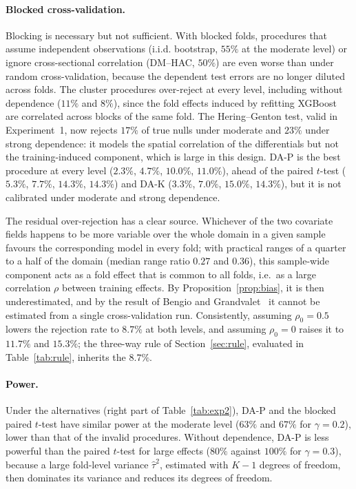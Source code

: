 \paragraph{Blocked cross-validation.} Blocking is necessary but not sufficient. With blocked folds, procedures that assume independent observations (i.i.d. bootstrap, $55\%$ at the moderate level) or ignore cross-sectional correlation (DM--HAC, $50\%$) are even worse than under random cross-validation, because the dependent test errors are no longer diluted across folds. The cluster procedures over-reject at every level, including without dependence ($11\%$ and $8\%$), since the fold effects induced by refitting XGBoost are correlated across blocks of the same fold. The Hering--Genton test, valid in Experiment~1, now rejects $17\%$ of true nulls under moderate and $23\%$ under strong dependence: it models the spatial correlation of the differentials but not the training-induced component, which is large in this design. DA-P is the best procedure at every level ($2.3\%$, $4.7\%$, $10.0\%$, $11.0\%$), ahead of the paired $t$-test ($5.3\%$, $7.7\%$, $14.3\%$, $14.3\%$) and DA-K ($3.3\%$, $7.0\%$, $15.0\%$, $14.3\%$), but it is not calibrated under moderate and strong dependence.

The residual over-rejection has a clear source. Whichever of the two covariate fields happens to be more variable over the whole domain in a given sample favours the corresponding model in every fold; with practical ranges of a quarter to a half of the domain (median range ratio $0.27$ and $0.36$), this sample-wide component acts as a fold effect that is common to all folds, i.e.\ as a large correlation $\rho$ between training effects. By Proposition~\ref{prop:bias}, it is then underestimated, and by the result of Bengio and Grandvalet~\cite{bengio2004} it cannot be estimated from a single cross-validation run. Consistently, assuming $\rho_0=0.5$ lowers the rejection rate to $8.7\%$ at both levels, and assuming $\rho_0=0$ raises it to $11.7\%$ and $15.3\%$; the three-way rule of Section~\ref{sec:rule}, evaluated in Table~\ref{tab:rule}, inherits the $8.7\%$.

\paragraph{Power.} Under the alternatives (right part of Table~\ref{tab:exp2}), DA-P and the blocked paired $t$-test have similar power at the moderate level ($63\%$ and $67\%$ for $\gamma=0.2$), lower than that of the invalid procedures. Without dependence, DA-P is less powerful than the paired $t$-test for large effects ($80\%$ against $100\%$ for $\gamma=0.3$), because a large fold-level variance $\hat\tau^2$, estimated with $K-1$ degrees of freedom, then dominates its variance and reduces its degrees of freedom.

